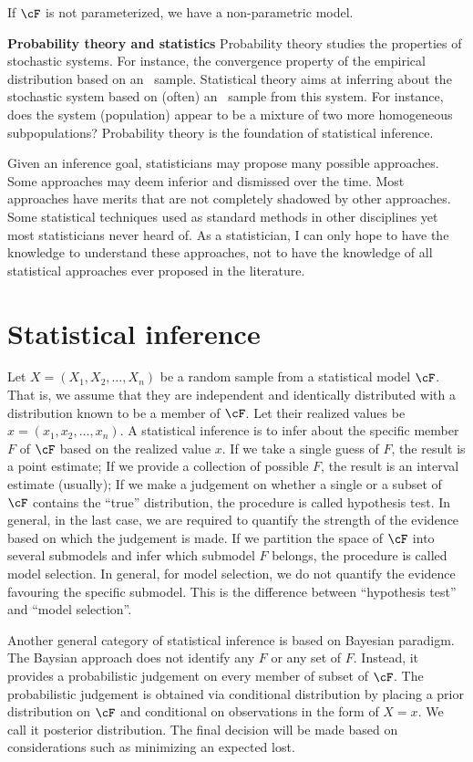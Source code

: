 If $\cF$ is not parameterized, we have a non-parametric model.

\vs\no
{\bf Probability theory and statistics}
Probability theory studies the properties of stochastic systems.
For instance, the convergence property of the empirical distribution
based on an \iid\ sample. Statistical theory aims at inferring about the
stochastic system based on (often) an \iid\ sample from this system.
For instance, does the system (population) appear to be a mixture of two
more homogeneous subpopulations?
Probability theory is the foundation of statistical inference.

Given an inference goal, statisticians may propose many possible
approaches. Some approaches may deem inferior and dismissed
over the time. Most approaches have merits that are not completely
shadowed by other approaches.
Some statistical techniques used as standard
methods in other disciplines yet most statisticians never heard of.
As a statistician, I can only hope to have the knowledge to understand
these approaches, not to have the knowledge of all statistical
approaches ever proposed in the literature. 

\section{Statistical inference}
Let $X = (X_1, X_2, \ldots, X_n)$ be a random sample from a statistical
model $\cF$. That is, we assume that they are independent and
identically distributed with a distribution known to be a member of $\cF$. 
Let their realized values be $x = (x_1, x_2, \ldots, x_n)$. 
A statistical inference is to infer about the specific member $F$ of $\cF$
based on the realized value $x$. If we take a single guess of $F$, the result
is a point estimate; If we provide a collection of possible $F$, the result is
an interval estimate (usually); If we make a judgement on whether
a single or a subset of $\cF$ contains the ``true'' distribution, the
procedure is called hypothesis test. In general, in the last case, we
are required to quantify the strength of the evidence based on which
the judgement is made. If we partition the space of $\cF$ into several
submodels and infer which submodel $F$ belongs, the procedure is called model selection.
In general, for model selection, we do not quantify the evidence favouring the specific submodel.
This is the difference between ``hypothesis test'' and ``model selection''.

Another general category of statistical inference is based on Bayesian
paradigm. The Baysian approach does not identify any $F$ or any set of $F$.
Instead, it provides a probabilistic judgement on every member of subset
of $\cF$. The probabilistic judgement is obtained via conditional distribution
by placing a prior distribution on $\cF$ and conditional on observations
in the form of $X = x$. We call it posterior distribution.
The final decision will be made based on considerations such as minimizing
an expected lost.

